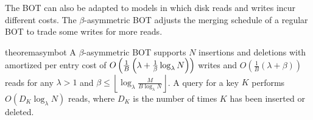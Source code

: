 The BOT can also be adapted to models in which disk reads and writes incur
different costs. The $\beta$-asymmetric BOT adjusts the merging schedule of a
regular BOT to trade some writes for more reads.

\begin{restatable}{theorem}{asymbot}\label{thm:bot-asymmetric}
	A $\beta$-asymmetric BOT supports $N$ insertions and deletions with
	amortized per entry cost of $O\left(\frac{1}{B}\left(\lambda +
	\frac{1}{\beta}\log_{\lambda}{N} \right)\right)$ writes and
	$O\left(\frac{1}{B}\left(\lambda + \beta\right)\right)$ reads for any
	$\lambda > 1$ and $\beta \leq
	\left\lfloor\log_\lambda\frac{M}{B\log_\lambda N}\right\rfloor$. A query
	for a key $K$ performs $O(D_K\log_\lambda N)$ reads, where $D_K$ is the
	number of times $K$ has been inserted or deleted.
\end{restatable}
